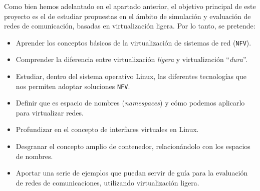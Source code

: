 \documentclass[a4paper, oneside, 12pt]{book}
\begin{document}
	\noindent Como bien hemos adelantado en el apartado anterior, el objetivo principal de este proyecto es el de estudiar propuestas en el ámbito de simulación y evaluación de redes de comunicación, basadas en virtualización ligera. Por lo tanto, se pretende: 
	\begin{itemize}
		\item Aprender los conceptos básicos de la virtualización de sistemas de red (\texttt{NFV}).
		\item Comprender la diferencia entre virtualización \textit{ligera} y virtualización ``\textit{dura}''.
		\item Estudiar, dentro del sistema operativo Linux, las diferentes tecnologías que nos permiten adoptar soluciones \texttt{NFV}.
		\item Definir que es espacio de nombres (\textit{namespaces}) y cómo podemos aplicarlo para virtualizar redes.
		\item Profundizar en el concepto de interfaces virtuales en Linux.
		\item Desgranar el concepto amplio de contenedor, relacionándolo con los espacios de nombres.
		\item Aportar una serie de ejemplos que puedan servir de guía para la evaluación de redes de comunicaciones, utilizando virtualización ligera.
	\end{itemize}
\end{document}
